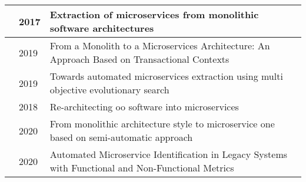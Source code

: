 \begin{table}[ht]
\begin{tabular}{>{\raggedright}m{75pt} >{\raggedright}m{20pt} >{\raggedright\arraybackslash}m{230pt}}
        \citeauthor{mazlami2017extraction} \cite{mazlami2017extraction}
        & 2017
        & Extraction of microservices from monolithic software architectures \\
        \midrule
        \citeauthor{nunes2019monolith} \cite{nunes2019monolith}
        & 2019
        & From a Monolith to a Microservices Architecture: An Approach Based on Transactional Contexts \\
        \midrule
        \citeauthor{saidani2019towards} \cite{saidani2019towards}
        & 2019
        & Towards automated microservices extraction using multi objective evolutionary search \\
        \midrule
        \citeauthor{selmadji2018re} \cite{selmadji2018re}
        & 2018
        & Re-architecting oo software into microservices \\
        \midrule
        \citeauthor{selmadji2020monolithic} \cite{selmadji2020monolithic}
        & 2020
        & From monolithic architecture style to microservice one based on semi-automatic approach \\
        \midrule
        \citeauthor{zhang2020automated} \cite{zhang2020automated}
        & 2020
        & Automated Microservice Identification in Legacy Systems with Functional and Non-Functional Metrics \\
        \bottomrule
    \end{tabular}
\end{table}

